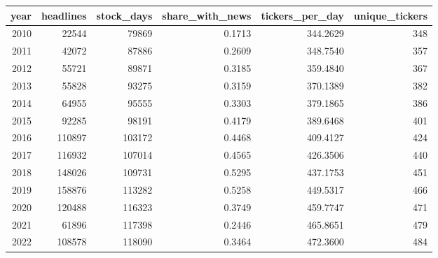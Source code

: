 \begin{tabular}{rrrrrr}
\toprule
year & headlines & stock\_days & share\_with\_news & tickers\_per\_day & unique\_tickers \\
\midrule
2010 & 22544 & 79869 & 0.1713 & 344.2629 & 348 \\
2011 & 42072 & 87886 & 0.2609 & 348.7540 & 357 \\
2012 & 55721 & 89871 & 0.3185 & 359.4840 & 367 \\
2013 & 55828 & 93275 & 0.3159 & 370.1389 & 382 \\
2014 & 64955 & 95555 & 0.3303 & 379.1865 & 386 \\
2015 & 92285 & 98191 & 0.4179 & 389.6468 & 401 \\
2016 & 110897 & 103172 & 0.4468 & 409.4127 & 424 \\
2017 & 116932 & 107014 & 0.4565 & 426.3506 & 440 \\
2018 & 148026 & 109731 & 0.5295 & 437.1753 & 451 \\
2019 & 158876 & 113282 & 0.5258 & 449.5317 & 466 \\
2020 & 120488 & 116323 & 0.3749 & 459.7747 & 471 \\
2021 & 61896 & 117398 & 0.2446 & 465.8651 & 479 \\
2022 & 108578 & 118090 & 0.3464 & 472.3600 & 484 \\
\bottomrule
\end{tabular}
